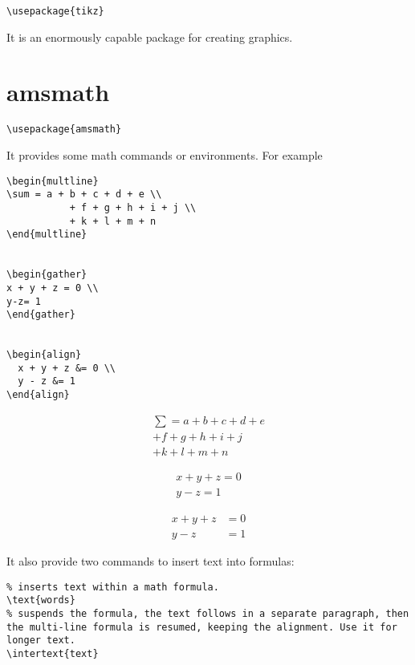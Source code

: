 \begin{lstlisting}
\usepackage{tikz}
\end{lstlisting}


It is an enormously capable package for creating graphics.


\section{amsmath}
\label{sec:amsmath}

\begin{lstlisting}
\usepackage{amsmath}
\end{lstlisting}


It provides some math commands or environments. For example
\begin{lstlisting}
\begin{multline}
\sum = a + b + c + d + e \\
           + f + g + h + i + j \\
           + k + l + m + n 
\end{multline}


\begin{gather}
x + y + z = 0 \\ 
y-z= 1
\end{gather}


\begin{align}
  x + y + z &= 0 \\
  y - z &= 1
\end{align}
\end{lstlisting}


\begin{multline}
\sum = a + b + c + d + e \\
           + f + g + h + i + j \\
           + k + l + m + n 
\end{multline}


\begin{gather}
x + y + z = 0 \\ 
y-z= 1
\end{gather}


\begin{align}
  x + y + z &= 0 \\
  y - z &= 1
\end{align}


It also provide two commands to insert text into formulas:
\begin{lstlisting}
% inserts text within a math formula. 
\text{words}
% suspends the formula, the text follows in a separate paragraph, then the multi-line formula is resumed, keeping the alignment. Use it for longer text. 
\intertext{text}
\end{lstlisting}

